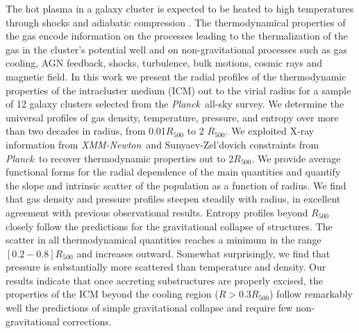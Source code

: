 \documentclass[traditabstract   ]{aa} %
\newcommand{\xmm}{{\it XMM-Newton}}
\newcommand{\planck}{{\it Planck}}
\begin{document}
\abstract
{The hot plasma in a galaxy cluster is expected to be heated to high temperatures through shocks and adiabatic compression%
. The thermodynamical properties of the gas encode information on the processes leading to the thermalization of the gas in the cluster’s potential well and on non-gravitational processes such as gas cooling, AGN feedback, {shocks, turbulence, bulk motions, cosmic rays and magnetic field}.}
{In this work we present the radial profiles of the thermodynamic properties of the intracluster medium (ICM) out to the virial radius for a sample of 12 galaxy clusters selected from the \planck\ all-sky survey. We determine the universal profiles of gas density, temperature, pressure, and entropy over more than two decades in radius{, from 0.01$R_{500}$ to 2 $R_{500}$.}}
{We exploited  X-ray information from \xmm\ and Sunyaev-Zel'dovich constraints from \planck\ to recover thermodynamic properties out to $2 R_{500}$. We provide average functional forms for the radial dependence of the main quantities and quantify the slope and intrinsic scatter of the population as a function of radius.}
{We find that gas density and pressure profiles steepen steadily with radius, in excellent agreement with previous observational results. Entropy profiles beyond $R_{500}$ closely follow the predictions for the gravitational collapse of structures. The scatter in all thermodynamical quantities reaches a minimum in the range $[0.2-0.8]R_{500}$ and increases outward. Somewhat surprisingly, we find that pressure is substantially more scattered than temperature and density. }
{Our results indicate that once accreting substructures are properly excised, the properties of the ICM beyond the cooling region ($R>0.3R_{500}$) follow remarkably well the predictions of simple gravitational collapse and require few non-gravitational corrections.}


\maketitle %

\end{document}
